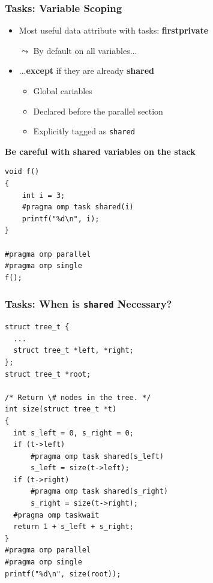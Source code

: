 \documentclass{beamer}
\begin{document}

\begin{frame}[fragile=singleslide]
  \frametitle{Tasks: Variable Scoping}

  \begin{itemize}
  \item Most useful data attribute with tasks: \textbf{firstprivate}
  \item[$\leadsto$] By default on all variables...
  \item ...\alert{\textbf{except}} if they are already \textbf{shared}
    \begin{itemize}
    \item Global cariables 
    \item Declared before the parallel section
    \item Explicitly tagged as \texttt{shared}
    \end{itemize}
  \end{itemize}

  \begin{alertblock}{\textbf{Be careful with shared variables on the stack}}
\begin{verbatim}
void f()
{
    int i = 3;
    #pragma omp task shared(i)
    printf("%d\n", i);
}

#pragma omp parallel
#pragma omp single
f();
\end{verbatim}
  \end{alertblock}
\end{frame}


\begin{frame}[fragile=singleslide]
  \frametitle{Tasks: When is \texttt{shared} Necessary?}

\begin{verbatim}
struct tree_t {
  ...
  struct tree_t *left, *right;
};
struct tree_t *root;

/* Return \# nodes in the tree. */
int size(struct tree_t *t)
{
  int s_left = 0, s_right = 0;
  if (t->left)
      #pragma omp task shared(s_left)
      s_left = size(t->left);
  if (t->right) 
      #pragma omp task shared(s_right)
      s_right = size(t->right);
  #pragma omp taskwait
  return 1 + s_left + s_right;
}
#pragma omp parallel
#pragma omp single
printf("%d\n", size(root));
\end{verbatim}
\end{frame}
\end{document}
